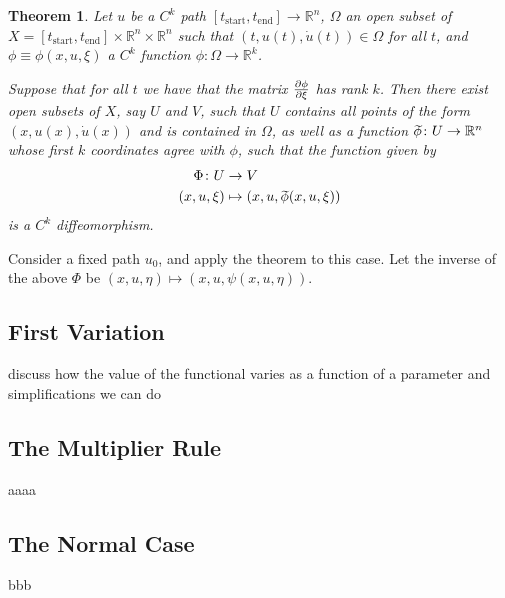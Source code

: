 \documentclass{article}
\newtheorem{theorem}{Theorem}
\theoremstyle{nonumberplain}
\newcommand{\R}{\mathbb{R}}
\newcommand{\tstart}{\mathrm{start}}
\newcommand{\tend}{\mathrm{end}}
\newcommand{\wtphi}{
  \mspace{2mu}
  \widetilde{\mspace{-2mu}\smash[t]{\phi}}
}
\begin{document}
\begin{theorem}
Let $u$ be a $C^k$ path $[t_\tstart,t_\tend] \to \R^n$, $\Omega$ an open subset of $X = [t_\tstart,t_\tend] \times \R^n \times \R^n$ such that $(t,u(t),\dot u(t)) \in \Omega$ for all $t$, and $\phi \equiv \phi(x,u,\xi)$ a $C^k$ function $\phi \colon \Omega \to \R^k$.

Suppose that for all $t$ we have that the matrix $\diffp\phi\xi$ has rank $k$. Then there exist open subsets of $X$, say $U$ and $V$, such that $U$ contains all points of the form $(x,u(x),\dot u(x))$ and is contained in $\Omega$, as well as a function $\wtphi \colon U \to \R^n$ whose first $k$ coordinates agree with $\phi$, such that the function given by
\begin{align*}
\Phi \colon U &\to V\\
(x,u,\xi) &\mapsto (x,u,\wtphi(x,u,\xi))
\end{align*}
is a $C^k$ diffeomorphism.
\end{theorem}

Consider a fixed path $u_0$, and apply the theorem to this case. Let the inverse of the above $\Phi$ be $(x,u,\eta) \mapsto (x,u,\psi(x,u,\eta))$.

\subsection{First Variation}

discuss how the value of the functional varies as a function of a parameter and simplifications we can do

\subsection{The Multiplier Rule}

aaaa

\subsection{The Normal Case}

bbb
\end{document}
